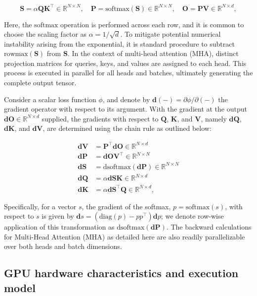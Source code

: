\begin{equation*}
  \mathbf{S} = \alpha \mathbf{Q} \mathbf{K}^\top \in \mathbb{R}^{N \times N}, \quad \mathbf{P} = \mathrm{softmax}(\mathbf{S}) \in \mathbb{R}^{N \times N}, \quad \mathbf{O} = \mathbf{P}\mathbf{V} \in \mathbb{R}^{N \times d},
\end{equation*}

Here, the $\mathrm{softmax}$ operation is performed across each row, and it is common to choose the scaling factor as $\alpha = 1/\sqrt{d}$. To mitigate potential numerical instability arising from the exponential, it is standard procedure to subtract $\mathrm{rowmax}(\mathbf{S})$ from $\mathbf{S}$. In the context of multi-head attention (MHA), distinct projection matrices for queries, keys, and values are assigned to each head. This process is executed in parallel for all heads and batches, ultimately generating the complete output tensor.

Consider a scalar loss function $\phi$, and denote by $\mathbf{d}(-) = \partial \phi / \partial (-)$ the gradient operator with respect to its argument. With the gradient at the output $\mathbf{dO} \in \mathbb{R}^{N \times d}$ supplied, the gradients with respect to $\mathbf{Q}$, $\mathbf{K}$, and $\mathbf{V}$, namely $\mathbf{dQ}$, $\mathbf{dK}$, and $\mathbf{dV}$, are determined using the chain rule as outlined below:

\begin{align*}
  \mathbf{dV} &= \mathbf{P}^\top \mathbf{dO} \in \mathbb{R}^{N \times d} \\
  \mathbf{dP} &= \mathbf{dO} \mathbf{V}^\top \in \mathbb{R}^{N \times N} \\
  \mathbf{dS} &= \mathrm{dsoftmax} (\mathbf{dP}) \in \mathbb{R}^{N \times N} \\
  \mathbf{dQ} &= \alpha \mathbf{dS} \mathbf{K} \in \mathbb{R}^{N \times d} \\
  \mathbf{dK} &= \alpha \mathbf{dS}^\top \mathbf{Q} \in \mathbb{R}^{N \times d},
\end{align*}

Specifically, for a vector $s$, the gradient of the softmax, $p = \mathrm{softmax}(s)$, with respect to $s$ is given by $\mathbf{d}s = (\mathrm{diag}(p) - p p^\top) \mathbf{d}p$; we denote row-wise application of this transformation as $\mathrm{dsoftmax}(\mathbf{dP})$. The backward calculations for Multi-Head Attention (MHA) as detailed here are also readily parallelizable over both heads and batch dimensions.

\subsection{GPU hardware characteristics and execution model}
\label{subsec:hardware}

